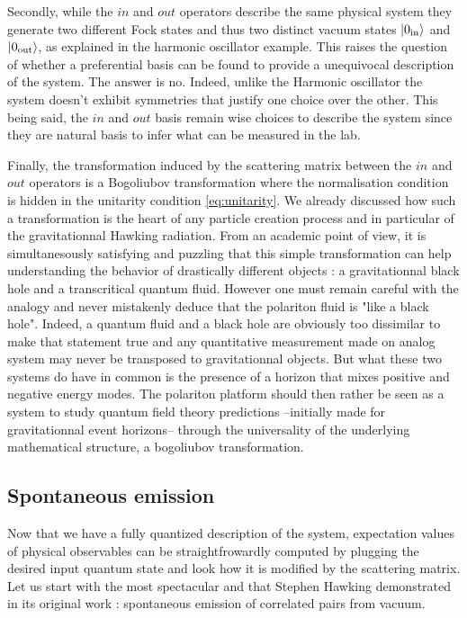 \bigskip

Secondly, while the $in$ and $out$ operators describe the same physical system they generate two different Fock states and thus two distinct vacuum states $\ket{0_{\mathrm{in}}}$ and $\ket{0_{\mathrm{out}}}$, as explained in the harmonic oscillator example.
This raises the question of whether a preferential basis can be found to provide a unequivocal description of the system. The answer is no.
 Indeed, unlike the Harmonic oscillator the system doesn't exhibit symmetries that justify one choice over the other. This being said, the $in$
and $out$ basis remain wise choices to describe the system since they are natural basis to infer what can be measured in the lab.

\bigskip

Finally, the transformation induced by the scattering matrix between the $in$ and $out$ operators is a Bogoliubov transformation where the 
normalisation condition is hidden in the unitarity condition \ref{eq:unitarity}. We already discussed how such a transformation is the heart 
of any particle creation process and in particular of the gravitationnal Hawking radiation. From an academic point of view, it is simultanesously satisfying and puzzling 
that this simple transformation can help understanding the behavior of drastically different objects : a gravitationnal black hole and a transcritical quantum fluid. 
However one must remain careful with the analogy and never mistakenly deduce that the polariton fluid is "like a black hole". Indeed, a quantum fluid and a black hole are obviously 
too dissimilar to make that statement true and any quantitative measurement made on analog system may never be transposed to gravitationnal objects. But what these two systems do have in common is the presence of a horizon that mixes positive and negative energy modes. The polariton 
platform should then rather be seen as a system to study quantum field theory predictions --initially made for gravitationnal event horizons-- through the universality of the underlying 
mathematical structure, a bogoliubov transformation.

\subsection{Spontaneous emission}

\label{subsec:spontaneous_emission}

Now that we have a fully quantized description of the system, expectation values of physical observables can be straightfrowardly
computed by plugging the desired input quantum state and look how it is modified by the scattering matrix. Let us start with the most spectacular and that
Stephen Hawking demonstrated in its original work \cite{hawking_black_1972} : spontaneous emission of correlated pairs from vacuum.


